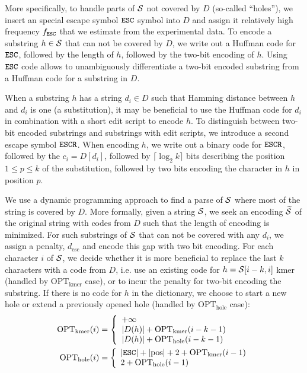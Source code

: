 \documentclass[12pt]{cmuthesis}
\begin{document}
  More specifically, to handle parts of $\mathcal{S}$ not covered by $D$ (so-called ``holes''), we insert an special escape symbol $\texttt{ESC}$ symbol into $D$ and assign it relatively high frequency $f_{\texttt{ESC}}$ that we estimate from the experimental data. To encode a substring $h \in \mathcal{S}$ that can not be covered by $D$, we write out a Huffman code for $\texttt{ESC}$, followed by the length of $h$, followed by the two-bit encoding of $h$. Using $\texttt{ESC}$ code allows to unambiguously differentiate a two-bit encoded substring from a Huffman code for a substring in $D$.

  When a substring $h$ has a string $d_i \in D$ such that Hamming distance between $h$ and $d_i$ is one (a substitution), it may be beneficial to use the Huffman code for $d_i$ in combination with a short edit script to encode $h$. To distinguish between two-bit encoded substrings and substrings with edit scripts, we introduce a second escape symbol $\texttt{ESCR}$. When encoding $h$, we write out a binary code for $\texttt{ESCR}$, followed by the $c_i = D[d_i]$, followed by $\lceil \log_2 k \rceil$ bits describing the position $1 \leq p \leq k$ of the substitution, followed by two bits encoding the character in $h$ in position $p$.


  We use a dynamic programming approach to find a parse of $\mathcal{S}$ where most of the string is covered by $D$. More formally, given a string $\mathcal{S}$, we seek an encoding $\widetilde{\mathcal{S}}$ of the original string with codes from $D$ such that the length of encoding is minimized. For such substrings of $\mathcal{S}$ that can not be covered with any $d_i$, we assign a penalty, $d_{\mathrm{esc}}$ and encode this gap with two bit encoding. For each character $i$ of $\mathcal{S}$, we decide whether it is more beneficial to replace the last $k$ characters with a code from $D$, i.e. use an existing code for $h = \mathcal{S}[i-k,i]$ kmer (handled by $\mathrm{OPT_{kmer}}$ case), or to incur the penalty for two-bit encoding the substring. If there is no code for $h$ in the dictionary, we choose to start a new hole or extend a previously opened hole (handled by $\mathrm{OPT_{hole}}$ case):
  \begin{align}
  \mathrm{OPT_{kmer}}(i) & = \left \{
      \begin{array}{l l}
        + \infty \\
        |D(h)| + \mathrm{OPT_{kmer}}(i-k-1) \\
        |D(h)| + \mathrm{OPT_{hole}}(i-k-1) \\
      \end{array} \right. \\
  \mathrm{OPT_{hole}}(i) & = \left \{
      \begin{array}{l l}
        |\texttt{ESC}| + |\mathrm{pos}| + 2 + \mathrm{OPT_{kmer}}(i-1) \\
        2 + \mathrm{OPT_{hole}}(i-1) \\
      \end{array} \right.
    \label{eqn:denovo:twobit}
  \end{align}
\end{document}
